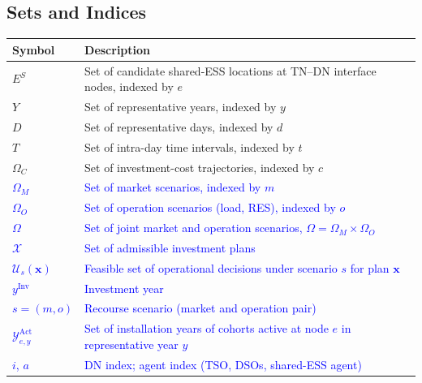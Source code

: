 \documentclass[preprint,12pt]{elsarticle}
\begin{document}
\subsection*{Sets and Indices}

\begingroup
    \footnotesize
    \setlength{\LTpre}{0pt}
    \setlength{\LTpost}{0pt}
    \begin{longtable}{@{}>{\raggedright\arraybackslash}p{} >{\raggedright\arraybackslash}p{}@{}}
        \toprule
        \textbf{Symbol} & \textbf{Description} \\
        \midrule
        \endhead
        \midrule
        \endfoot
        \bottomrule
        \endlastfoot
        $E^S$       & Set of candidate shared-ESS locations at TN–DN interface nodes, indexed by $e$ \\
        $Y$         & Set of representative years, indexed by $y$ \\
        $D$         & Set of representative days, indexed by $d$ \\
        $T$         & Set of intra-day time intervals, indexed by $t$ \\
        $\Omega_C$  & Set of investment-cost trajectories, indexed by $c$ \\
        \textcolor{blue}{$\Omega_M$}  & \textcolor{blue}{Set of market scenarios, indexed by $m$} \\
        \textcolor{blue}{$\Omega_O$}  & \textcolor{blue}{Set of operation scenarios (load, RES), indexed by $o$} \\
        \textcolor{blue}{$\Omega$} & \textcolor{blue}{Set of joint market and operation scenarios, $\Omega=\Omega_M\times\Omega_O$} \\     
        \textcolor{blue}{$\mathcal{X}$} & \textcolor{blue}{Set of admissible investment plans} \\
        \textcolor{blue}{$\mathcal{U}_s(\boldsymbol{x})$} & \textcolor{blue}{Feasible set of operational decisions under scenario $s$ for plan $\boldsymbol{x}$} \\
        \textcolor{blue}{$y^{\text{Inv}}$} & \textcolor{blue}{Investment year} \\
        \textcolor{blue}{$s = (m,o)$} & \textcolor{blue}{Recourse scenario (market and operation pair)} \\
        \textcolor{blue}{$\mathcal{Y}^{\text{Act}}_{e,y}$} & \textcolor{blue}{Set of installation years of cohorts active at node $e$ in representative year $y$} \\
        \textcolor{blue}{$i$, $a$} & \textcolor{blue}{DN index; agent index (TSO, DSOs, shared-ESS agent)} \\
    \end{longtable}
    \addtocounter{table}{-1}
\endgroup
\end{document}
